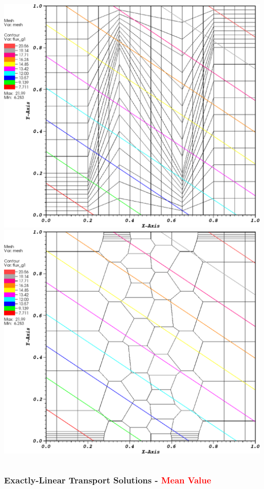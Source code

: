 \documentclass[compress,10pt]{beamer}
\newcommand{\tcr}[1]{\textcolor{red}{#1}}
\begin{document}
\begin{frame}[t]
{\begin{columns}
{}\includegraphics[width=0.95\columnwidth]{images/z_quad_PWLD_k1.eps} \\
\vspace{3mm}
{}\includegraphics[width=0.95\columnwidth]{images/z_poly_PWLD_k1.eps} 
\end{columns}
}
{
\frametitle{Exactly-Linear Transport Solutions - \tcr{Mean Value}}
\centering
\begin{columns}
\centering

\end{columns}}
\end{frame}
\end{document}
